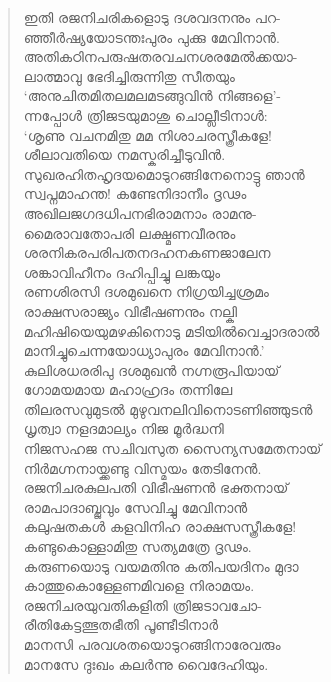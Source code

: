 \begin{verse}
ഇതി രജനിചരികളൊടു ദശവദനനും പറ-\\
ഞ്ഞീര്‍ഷ്യയോടന്തഃപുരം പുക്കു മേവിനാന്‍.\\
അതികഠിനപരുഷതരവചനശരമേല്‍ക്കയാ-\\
ലാത്മാവു ഭേദിച്ചിരുന്നിതു സീതയും\\
‘അനുചിതമിതലമലമടങ്ങുവിന്‍ നിങ്ങളെ’-\\
ന്നപ്പോള്‍ ത്രിജടയുമാശു ചൊല്ലീടിനാള്‍:\\
‘ശൃണു വചനമിതു മമ നിശാചരസ്ത്രീകളേ!\\
ശീലാവതിയെ നമസ്കരിച്ചീടുവിന്‍.\\
സുഖരഹിതഹൃദയമൊടുറങ്ങിനേനൊട്ടു ഞാന്‍\\
സ്വപ്നമാഹന്ത! കണ്ടേനിദാനീം ദൃഢം\\
അഖിലജഗദധിപനഭിരാമനാം രാമനു-\\
മൈരാവതോപരി ലക്ഷ്മണവീരനും\\
ശരനികരപരിപതനദഹനകണജാലേന\\
ശങ്കാവിഹീനം ദഹിപ്പിച്ചു ലങ്കയും\\
രണശിരസി ദശമുഖനെ നിഗ്രയിച്ചശ്രമം\\
രാക്ഷസരാജ്യം വിഭീഷണനും നല്കി\\
മഹിഷിയെയുമഴകിനൊടു മടിയില്‍വെച്ചാദരാല്‍\\
മാനിച്ചുചെന്നയോധ്യാപുരം മേവിനാന്‍.’\\
കുലിശധരരിപു ദശമുഖന്‍ നഗ്നരൂപിയായ്\\
ഗോമയമായ മഹാഹ്രദം തന്നിലേ\\
തിലരസവുമുടല്‍ മുഴുവനലിവിനൊടണിഞ്ഞുടന്‍\\
ധൃത്വാ നളദമാല്യം നിജ മൂര്‍ദ്ധനി\\
നിജസഹജ സചിവസുത സൈന്യസമേതനായ്\\
നിര്‍മഗ്നനായ്ക്കണ്ടു വിസ്മയം തേടിനേന്‍.\\
രജനിചരകുലപതി വിഭീഷണന്‍ ഭക്തനായ്\\
രാമപാദാബ്ജവും സേവിച്ചു മേവിനാന്‍\\
കലുഷതകള്‍ കളവിനിഹ രാക്ഷസസ്ത്രീകളേ!\\
കണ്ടുകൊള്ളാമിതു സത്യമത്രേ ദൃഢം.\\
കരുണയൊടു വയമതിനു കതിപയദിനം മുദാ\\
കാത്തുകൊള്ളേണമിവളെ നിരാമയം.\\
രജനിചരയുവതികളിതി ത്രിജടാവചോ-\\
രീതികേട്ടത്ഭുതഭീതി പൂണ്ടീടിനാര്‍\\
മാനസി പരവശതയൊടുറങ്ങിനാരേവരും\\
മാനസേ ദുഃഖം കലര്‍ന്നു വൈദേഹിയും.
\end{verse}


